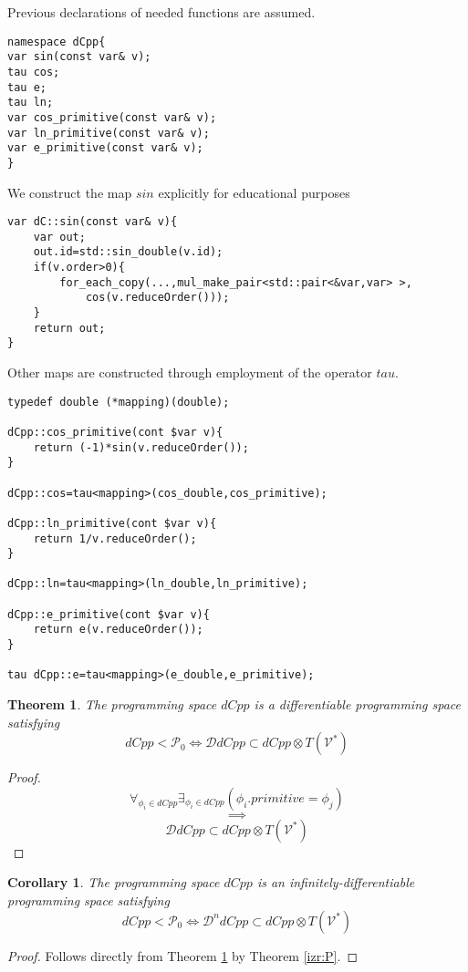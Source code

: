 \documentclass{article}
\newcommand{\VV}{\mathcal{V}}
\newcommand{\dP}{\mathcal{P}}
\newcommand{\DD}{\mathcal{D}}
\newtheorem{izrek}{Theorem}[section]
\newtheorem{corollary}{Corollary}[section]
\begin{document}
Previous declarations of needed functions are assumed. 

\begin{lstlisting}
namespace dCpp{
var sin(const var& v);
tau cos;
tau e;
tau ln;
var cos_primitive(const var& v);
var ln_primitive(const var& v);
var e_primitive(const var& v);
}
\end{lstlisting}

We construct the map $sin$ explicitly for educational purposes

\begin{lstlisting}
var dC::sin(const var& v){
    var out;
    out.id=std::sin_double(v.id);
    if(v.order>0){
    	for_each_copy(...,mul_make_pair<std::pair<&var,var> >,
    		cos(v.reduceOrder()));
    }
    return out;
}
\end{lstlisting}

Other maps are constructed through employment of the operator $tau$.

\begin{lstlisting}
typedef double (*mapping)(double);

dCpp::cos_primitive(cont $var v){
	return (-1)*sin(v.reduceOrder());
}

dCpp::cos=tau<mapping>(cos_double,cos_primitive);

dCpp::ln_primitive(cont $var v){
	return 1/v.reduceOrder();
}

dCpp::ln=tau<mapping>(ln_double,ln_primitive);

dCpp::e_primitive(cont $var v){
	return e(v.reduceOrder());
}

tau dCpp::e=tau<mapping>(e_double,e_primitive);

\end{lstlisting}

\begin{izrek}\label{izr:dCpp}
The programming space $dCpp$ is a differentiable programming space satisfying
\begin{equation}
dCpp<\dP_0\iff \DD dCpp\subset dCpp\otimes T(\VV^*)
\end{equation}
\end{izrek}
\begin{proof}
\begin{equation}
\forall_{\phi_i\in dCpp}\exists_{\phi_i\in dCpp}(\phi_i.primitive=\phi_j)
\end{equation}
$$\implies$$
\begin{equation}
\DD dCpp\subset dCpp\otimes T(\VV^*)
\end{equation}
\end{proof}
\begin{corollary}
The programming space $dCpp$ is an infinitely-differentiable programming space satisfying
\begin{equation}
dCpp<\dP_0\iff \DD^n dCpp\subset dCpp\otimes T(\VV^*)
\end{equation}
\end{corollary}
\begin{proof}
Follows directly from Theorem \ref{izr:dCpp} by Theorem \ref{izr:P}.
\end{proof}

  
\end{document}
